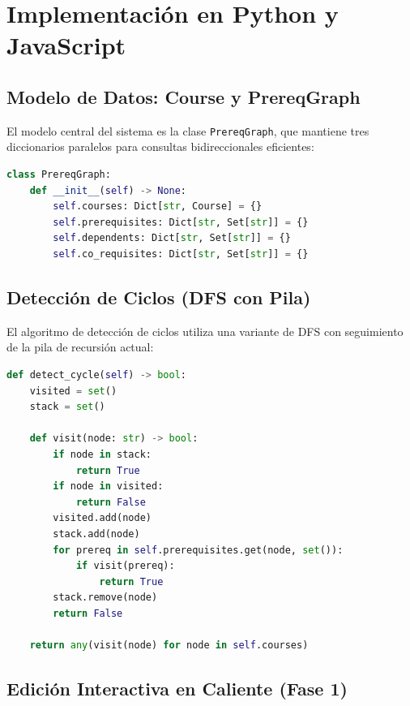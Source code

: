\documentclass[12pt]{report}
\begin{document}
\chapter{Implementación en Python y JavaScript}

\section{Modelo de Datos: Course y PrereqGraph}

El modelo central del sistema es la clase \texttt{PrereqGraph}, que mantiene tres diccionarios paralelos para consultas bidireccionales eficientes:

\begin{lstlisting}[caption=Estructura interna del PrereqGraph, label=lst:graph-struct, language=Python]
class PrereqGraph:
    def __init__(self) -> None:
        self.courses: Dict[str, Course] = {}
        self.prerequisites: Dict[str, Set[str]] = {}
        self.dependents: Dict[str, Set[str]] = {}
        self.co_requisites: Dict[str, Set[str]] = {}
\end{lstlisting}

\section{Detección de Ciclos (DFS con Pila)}

El algoritmo de detección de ciclos utiliza una variante de DFS con seguimiento de la pila de recursión actual:

\begin{lstlisting}[caption=Detección de ciclos en el DAG, label=lst:cycle-detection, language=Python]
def detect_cycle(self) -> bool:
    visited = set()
    stack = set()

    def visit(node: str) -> bool:
        if node in stack:
            return True
        if node in visited:
            return False
        visited.add(node)
        stack.add(node)
        for prereq in self.prerequisites.get(node, set()):
            if visit(prereq):
                return True
        stack.remove(node)
        return False

    return any(visit(node) for node in self.courses)
\end{lstlisting}

\section{Edición Interactiva en Caliente (Fase 1)}
\end{document}
